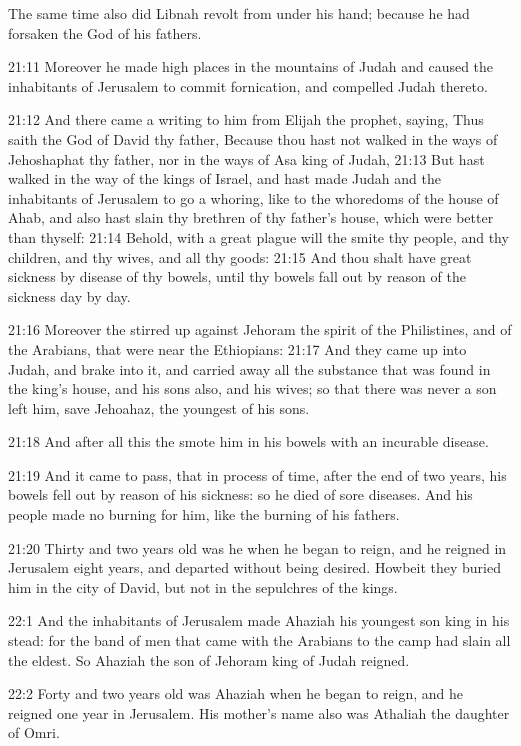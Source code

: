 The same time also did Libnah revolt from under his hand; because he
had forsaken the \LORD God of his fathers.

21:11 Moreover he made high places in the mountains of Judah and
caused the inhabitants of Jerusalem to commit fornication, and
compelled Judah thereto.

21:12 And there came a writing to him from Elijah the prophet, saying,
Thus saith the \LORD God of David thy father, Because thou hast not
walked in the ways of Jehoshaphat thy father, nor in the ways of Asa
king of Judah, 21:13 But hast walked in the way of the kings of
Israel, and hast made Judah and the inhabitants of Jerusalem to go a
whoring, like to the whoredoms of the house of Ahab, and also hast
slain thy brethren of thy father's house, which were better than
thyself: 21:14 Behold, with a great plague will the \LORD smite thy
people, and thy children, and thy wives, and all thy goods: 21:15 And
thou shalt have great sickness by disease of thy bowels, until thy
bowels fall out by reason of the sickness day by day.

21:16 Moreover the \LORD stirred up against Jehoram the spirit of the
Philistines, and of the Arabians, that were near the Ethiopians: 21:17
And they came up into Judah, and brake into it, and carried away all
the substance that was found in the king's house, and his sons also,
and his wives; so that there was never a son left him, save Jehoahaz,
the youngest of his sons.

21:18 And after all this the \LORD smote him in his bowels with an
incurable disease.

21:19 And it came to pass, that in process of time, after the end of
two years, his bowels fell out by reason of his sickness: so he died
of sore diseases. And his people made no burning for him, like the
burning of his fathers.

21:20 Thirty and two years old was he when he began to reign, and he
reigned in Jerusalem eight years, and departed without being desired.
Howbeit they buried him in the city of David, but not in the
sepulchres of the kings.

22:1 And the inhabitants of Jerusalem made Ahaziah his youngest son
king in his stead: for the band of men that came with the Arabians to
the camp had slain all the eldest. So Ahaziah the son of Jehoram king
of Judah reigned.

22:2 Forty and two years old was Ahaziah when he began to reign, and
he reigned one year in Jerusalem. His mother's name also was Athaliah
the daughter of Omri.

